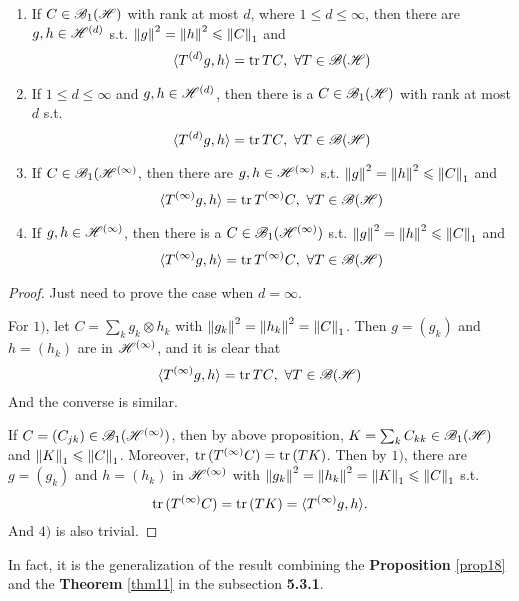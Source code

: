 \documentclass[a4paper,11pt]{report}
\begin{document}
\begin{thm} \label{thm15}
	\begin{enumerate}[label = \arabic*)]
		\item If $C \in \mathscr{B}_{1}\mathscr{(H)}$ with rank at most $d$, where $1 \leqslant d \leqslant \infty$, then there are $g,h \in \mathscr{H}^{(d)}$ s.t. $\left\lVert g\right\lVert^2 = \left\lVert h\right\lVert^2 \leqslant \left\lVert C\right\lVert_1$ and 
		\begin{equation*}
			\langle T^{(d)}g,h \rangle = \operatorname{tr}{TC},~ \forall T \in \mathscr{B(H)}
		\end{equation*}
		\item If $1 \leqslant d \leqslant \infty$ and $g,h \in \mathscr{H}^{(d)}$, then there is a $C \in \mathscr{B}_{1}\mathscr{(H)}$ with rank at most $d$ s.t.
		\begin{equation*}
			\langle T^{(d)}g,h \rangle = \operatorname{tr}{TC},~ \forall T \in \mathscr{B(H)}
		\end{equation*}
		\item If $C \in \mathscr{B}_1(\mathscr{H}^{(\infty)}$, then there are $g,h \in \mathscr{H}^{(\infty)}$ s.t. $\left\lVert g\right\lVert^2 = \left\lVert h\right\lVert^2 \leqslant \left\lVert C\right\lVert_1$ and
		\begin{equation*}
			\langle T^{(\infty)}g,h \rangle = \operatorname{tr}{T^{(\infty)}C},~ \forall T \in \mathscr{B(H)}
		\end{equation*}
		\item If $g,h \in \mathscr{H}^{(\infty)}$, then there is a $C \in \mathscr{B}_1(\mathscr{H}^{(\infty)})$ s.t. $\left\lVert g\right\lVert^2 = \left\lVert h\right\lVert^2 \leqslant \left\lVert C\right\lVert_1$ and
		\begin{equation*}
			\langle T^{(\infty)}g,h \rangle = \operatorname{tr}{T^{(\infty)}C},~ \forall T \in \mathscr{B(H)}
		\end{equation*}
	\end{enumerate}
\end{thm}
\begin{proof}
	Just need to prove the case when $d = \infty$.
	\item For $1)$, let $C = \sum_k g_k \otimes h_k$ with $\left\lVert g_k\right\lVert^2 = \left\lVert h_k\right\lVert^2 = \left\lVert C\right\lVert_1$. Then $g = (g_k)$ and $h = (h_k)$ are in $\mathscr{H}^{(\infty)}$, and it is clear that 
	\begin{equation*}
		\langle T^{(\infty)}g,h \rangle = \operatorname{tr}{TC},~ \forall T \in \mathscr{B(H)}
	\end{equation*}
	And the converse is similar.
	\item If $C = (C_{jk}) \in \mathscr{B}_1(\mathscr{H}^{(\infty)})$, then by above proposition, $K = \sum_k C_{kk} \in \mathscr{B}_{1}\mathscr{(H)}$ and $\left\lVert K\right\lVert_1 \leqslant \left\lVert C\right\lVert_1$. Moreover, $\operatorname{tr}{(T^{(\infty)}C)} = \operatorname{tr}{(TK)}$. Then by $1)$, there are $g = (g_k)$ and $h = (h_k)$ in $\mathscr{H}^{(\infty)}$ with $\left\lVert g_k\right\lVert^2 = \left\lVert h_k\right\lVert^2 = \left\lVert K\right\lVert_1 \leqslant \left\lVert C\right\lVert_1$ s.t.
	\begin{equation*}
		\operatorname{tr}{(T^{(\infty)}C)} = \operatorname{tr}{(TK)} = \langle T^{(\infty)}g,h \rangle.
	\end{equation*}
	And $4)$ is also trivial.
\end{proof}
\begin{rem}
	In fact, it is the generalization of the result combining the \textbf{Proposition} \ref{prop18} and the \textbf{Theorem} \ref{thm11} in the subsection \textbf{5.3.1}.
\end{rem}
\end{document}
